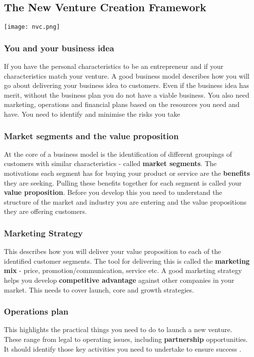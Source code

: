 \documentclass{article}[18pt]
\begin{document}
\subsection{The New Venture Creation Framework}
\begin{center}
\texttt{[image: nvc.png]}
\end{center}
\subsubsection{You and your business idea}
If you have the personal characteristics to be an entrepreneur and if your characteristics match your venture. A good business model describes how you will go about delivering your business idea to customers. Even if the business idea has merit, without the business plan you do not have a viable business. You also need marketing, operations and financial plans based on the resources you need and have. You need to identify and minimise the risks you take
\subsubsection{Market segments and the value proposition}
At the core of a business model is the identification of different groupings of customers with similar characteristics - called \textbf{market segments}. The motivations each segment has for buying your product or service are the \textbf{benefits} they are seeking. Pulling these benefits together for each segment is called your \textbf{value proposition}. Before you develop this you need to understand the structure of the market and industry you are entering and the value propositions they are offering customers.
\subsubsection{Marketing Strategy}
This describes how you will deliver your value proposition to each of the identified customer segments. The tool for delivering this is called the \textbf{marketing mix} - price, promotion/communication, service etc. A good marketing strategy helps you develop \textbf{competitive advantage} against other companies in your market. This needs to cover launch, core and growth strategies.
\subsubsection{Operations plan}
This highlights the practical things you need to do to launch a new venture. These range from legal to operating issues, including \textbf{partnership} opportunities. It should identify those key activities you need to undertake to ensure success .
\end{document}
